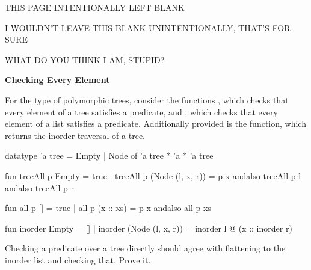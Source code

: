 
\newpage

\vspace*{\fill}

THIS PAGE INTENTIONALLY LEFT BLANK

I WOULDN'T LEAVE THIS BLANK UNINTENTIONALLY, THAT'S FOR SURE

WHAT DO YOU THINK I AM, STUPID?

\vspace*{\fill}

\newpage



\textbf{Checking Every Element}

For the type of polymorphic trees, consider the functions , which checks
that every element of a tree satisfies a predicate, and , which checks
that every element of a list satisfies a predicate. Additionally provided is the
 function, which returns the inorder traversal of a tree.
\begin{codeblock}
  datatype 'a tree = Empty | Node of 'a tree * 'a * 'a tree

  fun treeAll p Empty = true
    | treeAll p (Node (l, x, r)) =
        p x andalso treeAll p l andalso treeAll p r

  fun all p [] = true
    | all p (x :: xs) = p x andalso all p xs

  fun inorder Empty = []
    | inorder (Node (l, x, r)) = inorder l @ (x :: inorder r)
\end{codeblock}

Checking a predicate over a tree directly should agree with flattening to the
inorder list and checking that. Prove it.

